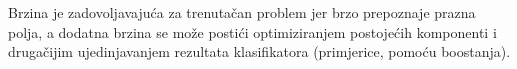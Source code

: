 \documentclass[a4paper,twocolumn,dvipdfm]{article}
\begin{document}
Brzina je zadovoljavajuća za trenutačan problem jer brzo
prepoznaje prazna polja, a dodatna brzina se može postići optimiziranjem
postojećih komponenti i drugačijim ujedinjavanjem rezultata klasifikatora
(primjerice, pomoću boostanja).



\end{document}
